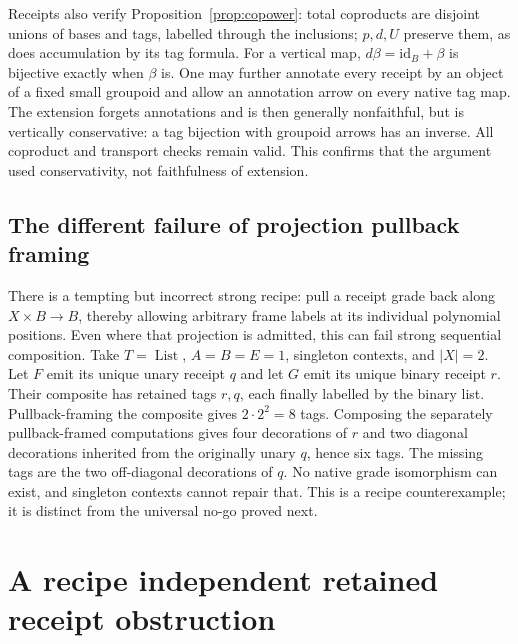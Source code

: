 \documentclass[11pt,a4paper]{article}
\theoremstyle{definition}
\newcommand{\id}{\mathrm{id}}
\newcommand{\List}{\operatorname{List}}
\begin{document}
Receipts also verify Proposition~\ref{prop:copower}: total coproducts are
disjoint unions of bases and tags, labelled through the inclusions;
$p,d,U$ preserve them, as does accumulation by its tag formula. For a
vertical map, $d\beta=\id_B+\beta$ is bijective exactly when $\beta$ is.
One may further annotate every receipt by an object of a fixed small
groupoid and allow an annotation arrow on every native tag map. The
extension forgets annotations and is then generally nonfaithful, but is
vertically conservative: a tag bijection with groupoid arrows has an
inverse. All coproduct and transport checks remain valid. This confirms
that the argument used conservativity, not faithfulness of extension.

\subsection{The different failure of projection pullback framing}
There is a tempting but incorrect strong recipe: pull a receipt grade back
along $X\times B\to B$, thereby allowing arbitrary frame labels at its
individual polynomial positions. Even where that projection is admitted,
this can fail strong sequential composition.
Take $T=\List$, $A=B=E=1$, singleton contexts, and $|X|=2$. Let $F$ emit
its unique unary receipt $q$ and let $G$ emit its unique binary receipt $r$.
Their composite has retained tags $r,q$, each finally labelled by the binary
list. Pullback-framing the composite gives $2\cdot2^2=8$ tags. Composing
the separately pullback-framed computations gives four decorations of $r$
and two diagonal decorations inherited from the originally unary $q$, hence
six tags. The missing tags are the two off-diagonal decorations of $q$.
No native grade isomorphism can exist, and singleton contexts cannot repair
that. This is a recipe counterexample; it is distinct from the universal
no-go proved next.

\section{A recipe independent retained receipt obstruction}\label{sec:nogo}
\end{document}
